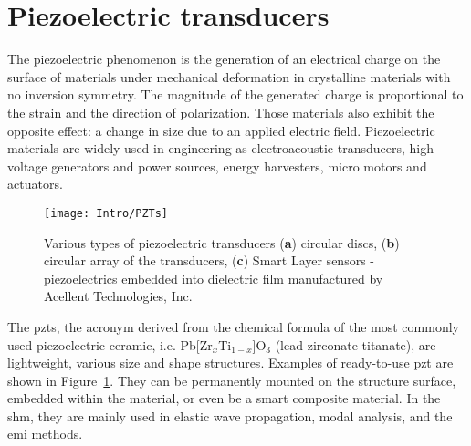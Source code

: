 \section{Piezoelectric transducers}
\label{sec:PZT}

The piezoelectric phenomenon is the generation of an electrical charge on the surface of materials under mechanical deformation in crystalline materials with no inversion symmetry.
The magnitude of the generated charge is proportional to the strain and the direction of polarization.
Those materials also exhibit the opposite effect: a change in size due to an applied electric field.
Piezoelectric materials are widely used in engineering as electroacoustic transducers, high voltage generators and power sources, energy harvesters, micro motors and actuators.
\begin{figure}[H]
	\begin{center}
		\texttt{[image: Intro/PZTs]}
	\end{center}
	\caption{Various types of piezoelectric transducers (\textbf{a}) circular discs, (\textbf{b}) circular array of the transducers, (\textbf{c}) Smart Layer\textsuperscript{\tiny\textregistered} sensors - piezoelectrics embedded into dielectric film manufactured by Acellent Technologies, Inc.}
	\label{fig:piezo}
\end{figure}
The \acp{pzt}, the acronym derived from the chemical formula of the most commonly used piezoelectric ceramic, i.e. Pb[Zr\(_x\)Ti\(_{1-x}\)]O\(_3\) (lead zirconate titanate), are lightweight, various size and shape structures.
Examples of ready-to-use \ac{pzt} are shown in Figure~\ref{fig:piezo}.
They can be permanently mounted on the structure surface, embedded within the material, or even be a smart composite material.
In the \ac{shm}, they are mainly used in elastic wave propagation, modal analysis, and the \ac{emi} methods.